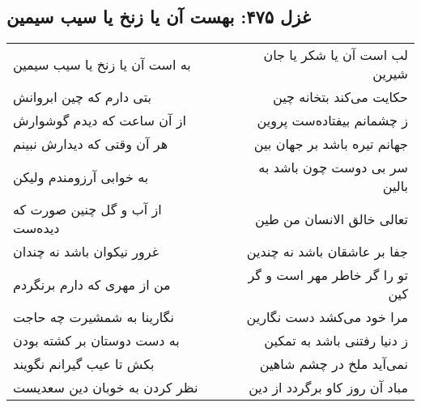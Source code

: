\begin{center}
\section*{غزل ۴۷۵: بهست آن یا زنخ یا سیب سیمین}
\label{sec:475}
\begin{longtable}{l p{0.5cm} r}
به است آن یا زنخ یا سیب سیمین
&&
لب است آن یا شکر یا جان شیرین
\\
بتی دارم که چین ابروانش
&&
حکایت می‌کند بتخانه چین
\\
از آن ساعت که دیدم گوشوارش
&&
ز چشمانم بیفتاده‌ست پروین
\\
هر آن وقتی که دیدارش نبینم
&&
جهانم تیره باشد بر جهان بین
\\
به خوابی آرزومندم ولیکن
&&
سر بی دوست چون باشد به بالین
\\
از آب و گل چنین صورت که دیده‌ست
&&
تعالی خالق الانسان من طین
\\
غرور نیکوان باشد نه چندان
&&
جفا بر عاشقان باشد نه چندین
\\
من از مهری که دارم برنگردم
&&
تو را گر خاطر مهر است و گر کین
\\
نگارینا به شمشیرت چه حاجت
&&
مرا خود می‌کشد دست نگارین
\\
به دست دوستان بر کشته بودن
&&
ز دنیا رفتنی باشد به تمکین
\\
بکش تا عیب گیرانم نگویند
&&
نمی‌آید ملخ در چشم شاهین
\\
نظر کردن به خوبان دین سعدیست
&&
مباد آن روز کاو برگردد از دین
\\
\end{longtable}
\end{center}
